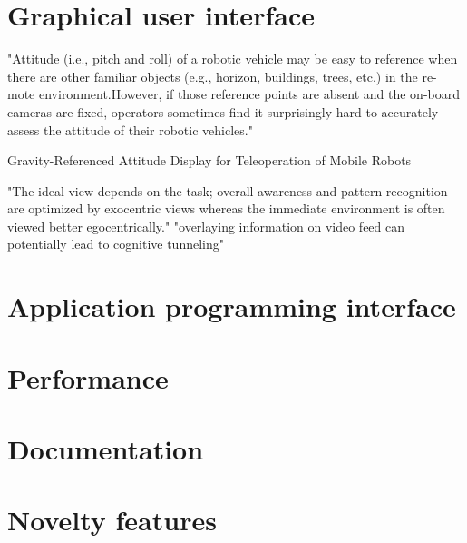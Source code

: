 
\section{Graphical user interface}

\citep{Chen2007} "Attitude (i.e., pitch and roll) of a robotic vehicle may be easy to reference when there are other familiar objects (e.g., horizon, buildings, trees, etc.) in the re- mote environment.However, if those reference points are absent and the on-board cameras are fixed, operators sometimes find it surprisingly hard to accurately assess the attitude of their robotic vehicles."

\citep{Wang2004} Gravity-Referenced Attitude Display for Teleoperation of Mobile Robots

\citep{Chen2007} "The ideal view depends on the task; overall awareness and pattern recognition are optimized by exocentric views whereas the immediate environment is often viewed better egocentrically."
"overlaying information on video feed can potentially lead to cognitive tunneling"


\section{Application programming interface}


\section{Performance}


\section{Documentation}




\section{Novelty features}


